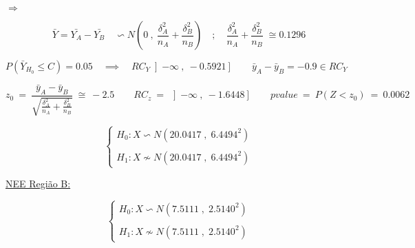 \hspace{3cm} $\Longrightarrow$ \hspace{1cm}
\begin{minipage}[l]{0pt}
	\[ \bar{Y}=\bar{Y_A}-\bar{Y_B} \quad \backsim N \left( 0\:,\: \frac{\delta_A^2}{n_A}+\frac{\delta_B^2}{n_B} \right) \quad ; \quad \frac{\delta_A^2}{n_A}+\frac{\delta_B^2}{n_B} \; \cong 0.1296 \]
\end{minipage}
\newline
\vspace{1cm}
\newline
$P(\bar{Y}_{H_0} \leqslant C)=0.05 \quad \implies \quad RC_Y\left] -\infty \:,\: -0.5921 \right] \qquad \bar{y}_A-\bar{y}_B=-0.9 \in RC_Y $
\newline
\vspace{1cm}
\newline
\begin{minipage}[l]{0pt}
	\[  z_0\:=\: \frac{\bar{y}_A-\bar{y}_B}{\sqrt{\frac{\delta_A^2}{n_A}+\frac{\delta_B^2}{n_B}}}\:\cong\: -2.5 \qquad
	RC_z \:=\: \left] -\infty \:,\: -1.6448 \right]  \qquad
	pvalue \:=\: P(Z<z_0) \:=\: 0.0062 \]
\end{minipage}
\newline
\vspace{1cm}
\newline
\begin{minipage}[l]{0pt}
	$$\left\lbrace\begin{array}{l}
		H_0: X \backsim N (20.0417\;,\;6.4494^2) \\
		\\
		H_1: X \nsim N (20.0417\;,\;6.4494^2)
	\end{array}\right.$$
\end{minipage}
\newline
\vspace{1cm}
\newline
\hspace*{5cm} \underline{NEE Região B:} \\
\begin{minipage}[l]{0pt}
	$$\left\lbrace\begin{array}{l}
		H_0: X \backsim N (7.5111\;,\;2.5140^2) \\
		\\
		H_1: X \nsim N (7.5111\;,\;2.5140^2)
	\end{array}\right.$$
\end{minipage}
\newline
\vspace{1cm}
\newline

